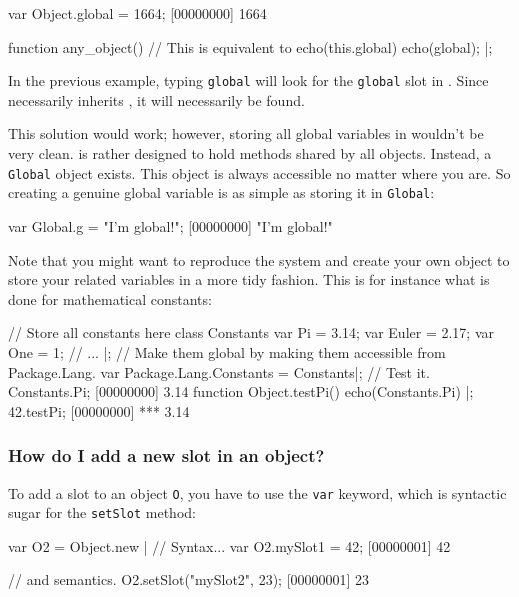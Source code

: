 \begin{urbiscript}
var Object.global = 1664;
[00000000] 1664

function any_object()
{
  // This is equivalent to echo(this.global)
  echo(global);
}|;
\end{urbiscript}

In the previous example, typing \lstinline|global| will look for the
\lstinline|global| slot in \this. Since \this necessarily inherits
, it will necessarily be found.

This solution would work; however, storing all global variables in
 wouldn't be very clean.  is rather
designed to hold methods shared by all objects. Instead, a
\lstinline|Global| object exists. This object is always accessible no matter
where you are.
So creating a genuine global variable is as simple as storing it in
\lstinline|Global|:

\begin{urbiscript}
var Global.g = "I'm global!";
[00000000] "I'm global!"
\end{urbiscript}

Note that you might want to reproduce the  system and
create your own object to store your related variables in a more tidy
fashion. This is for instance what is done for mathematical constants:

\begin{urbiscript}
// Store all constants here
class Constants
{
  var Pi = 3.14;
  var Euler = 2.17;
  var One = 1;
  // ...
}|;
// Make them global by making them accessible from Package.Lang.
var Package.Lang.Constants = Constants|;
// Test it.
Constants.Pi;
[00000000] 3.14
function Object.testPi() { echo(Constants.Pi) }|;
42.testPi;
[00000000] *** 3.14
\end{urbiscript}

\subsubsection{How do I add a new slot in an object?}
To add a slot to an object \lstinline{O}, you have to use the
\lstinline{var} keyword, which is syntactic sugar for the
\lstinline{setSlot} method:

\begin{urbiscript}
var O2 = Object.new |
// Syntax...
var O2.mySlot1 = 42;
[00000001] 42

// and semantics.
O2.setSlot("mySlot2", 23);
[00000001] 23
\end{urbiscript}

